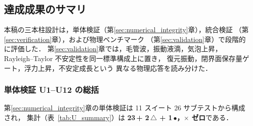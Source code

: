 \subsection{達成成果のサマリ}
\label{sec:achievements_summary}

本稿の三本柱設計は，単体検証（第\ref{sec:numerical_integrity}章），統合検証
（第\ref{sec:verification}章），および物理ベンチマーク
（第\ref{sec:validation}章）で段階的に評価した．
第\ref{sec:validation}章では，毛管波，振動液滴，気泡上昇，
Rayleigh--Taylor 不安定性を同一標準構成上に置き，
復元振動，閉界面保存量ゲート，浮力上昇，不安定成長という
異なる物理応答を読み分けた．

\subsubsection{単体検証 U1--U12 の総括}

第\ref{sec:numerical_integrity}章の単体検証は 11 スイート 26 サブテストから構成され，
集計（表~\ref{tab:U_summary}）は \textbf{23\,\checkmark + 2\,$\triangle$ + 1\,$\bullet$，$\times$ ゼロ}である．

